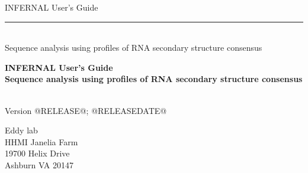 \begin{titlepage}
{\Large

\vspace*{\fill}

\begin{latexonly}
\noindent
{\Huge \textsf{INFERNAL User's Guide}} \\ 
\rule[2pt]{\textwidth}{1pt} \\
\hspace*{\fill} {\large \textsf{Sequence analysis using profiles of RNA secondary structure consensus}\\}
\end{latexonly}

\begin{htmlonly}
\begin{center}
{\Huge \textbf{INFERNAL User's Guide}}\\
{\large \textbf{Sequence analysis using profiles of RNA secondary
structure consensus}}\\
\end{center}
\end{htmlonly}

\vspace*{\fill}

\begin{center}
\textsl{}\\
Version @RELEASE@; @RELEASEDATE@ \\ 

\vspace*{\fill}

Eddy lab\\
HHMI Janelia Farm\\
19700 Helix Drive\\
Ashburn VA 20147\\
\textsl{} \\
\end{center}

\vspace*{\fill}

}
\end{titlepage}
